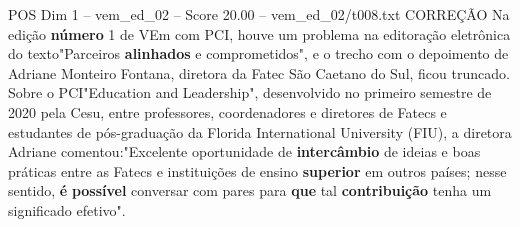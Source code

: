 \begin{textsample}{POS Dim 1 – vem\_ed\_02 – Score 20.00 – vem\_ed\_02/t008.txt}
CORREÇÃO Na edição \textbf{número} 1 de VEm com PCI, houve um problema na editoração eletrônica do texto"Parceiros \textbf{alinhados} e comprometidos", e o trecho com o depoimento de Adriane Monteiro Fontana, diretora da Fatec São Caetano do Sul, ficou truncado.
Sobre o PCI"Education and Leadership", desenvolvido no primeiro semestre de 2020 pela Cesu, entre professores, coordenadores e diretores de Fatecs e estudantes de pós-graduação da Florida International University (FIU), a diretora Adriane comentou:"Excelente oportunidade de \textbf{intercâmbio} de ideias e boas práticas entre as Fatecs e instituições de ensino \textbf{superior} em outros países; nesse sentido, \textbf{é} \textbf{possível} conversar com pares para \textbf{que} tal \textbf{contribuição} tenha um significado efetivo".

\end{textsample}
